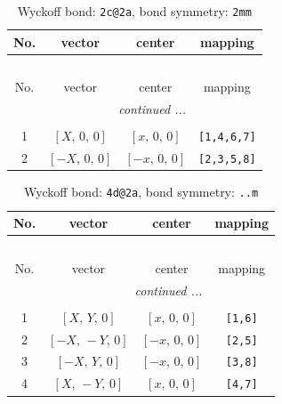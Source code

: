 \documentclass[fleqn,8pt]{jsarticle}
\begin{document}
\renewcommand{\arraystretch}{1.2}
\begin{longtable}{cccc}
\caption{Wyckoff bond: {\tt 2c@2a}, bond symmetry: {\tt 2mm}}
 \\
 \hline \hline
No. & vector & center & mapping \\ \hline \endfirsthead

\multicolumn{3}{l}{\tablename\ \thetable{}} \\
 \hline \hline
No. & vector & center & mapping \\ \hline \endhead

 \hline \hline
\multicolumn{3}{r}{\footnotesize\it continued ...} \\ \endfoot

 \hline \hline
\multicolumn{3}{r}{} \\ \endlastfoot

1 & $\left[ X,\, 0,\, 0 \right]$ & $\left[ x,\, 0,\, 0 \right]$ & {\tt [1,4,6,7]} \\ \hline
2 & $\left[ - X,\, 0,\, 0 \right]$ & $\left[ - x,\, 0,\, 0 \right]$ & {\tt [2,3,5,8]} \\
\end{longtable}
\renewcommand{\arraystretch}{1.2}
\begin{longtable}{cccc}
\caption{Wyckoff bond: {\tt 4d@2a}, bond symmetry: {\tt ..m}}
 \\
 \hline \hline
No. & vector & center & mapping \\ \hline \endfirsthead

\multicolumn{3}{l}{\tablename\ \thetable{}} \\
 \hline \hline
No. & vector & center & mapping \\ \hline \endhead

 \hline \hline
\multicolumn{3}{r}{\footnotesize\it continued ...} \\ \endfoot

 \hline \hline
\multicolumn{3}{r}{} \\ \endlastfoot

1 & $\left[ X,\, Y,\, 0 \right]$ & $\left[ x,\, 0,\, 0 \right]$ & {\tt [1,6]} \\ \hline
2 & $\left[ - X,\, - Y,\, 0 \right]$ & $\left[ - x,\, 0,\, 0 \right]$ & {\tt [2,5]} \\ \hline
3 & $\left[ - X,\, Y,\, 0 \right]$ & $\left[ - x,\, 0,\, 0 \right]$ & {\tt [3,8]} \\ \hline
4 & $\left[ X,\, - Y,\, 0 \right]$ & $\left[ x,\, 0,\, 0 \right]$ & {\tt [4,7]} \\
\end{longtable}
\end{document}
